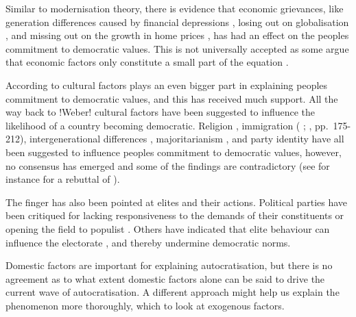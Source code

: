 Similar to modernisation theory, there is evidence that economic grievances, like generation differences caused by financial depressions \citep[pp. 132-174]{norris_cultural_2019}, losing out on globalisation \citep{ballard-rosa_economic_2021}, and missing out on the growth in home prices \citep{ansell_sheltering_2022}, has had an effect on the peoples commitment to democratic values. This is not universally accepted as some argue that economic factors only constitute a small part of the equation \citep{margalit_economic_2019}.

According to \citet{margalit_economic_2019} cultural factors plays an even bigger part in explaining peoples commitment to democratic values, and this has received much support. All the way back to !Weber! cultural factors have been suggested to influence the likelihood of a country becoming democratic. Religion \citep[pp.72-85]{huntington_third_1991}, immigration (\citeauthor{dinas_waking_2019} \citeyear{dinas_waking_2019}; \citeauthor{norris_cultural_2019} \citeyear{norris_cultural_2019}, pp.~175-212), intergenerational differences \citep{foa_youth_2020, foa_danger_2016, norris_cultural_2019, wuttke_have_2022}, majoritarianism \citep{grossman_majoritarian_2022, wunsch_demand_2023}, and party identity \citep{abramowitz_united_2019, bisgaard_how_2019, graham_democracy_2020, iyengar_strengthening_2018, krishnarajan_rationalizing_2023, peterson_partisan_2021, singer_fiddling_2023} have all been suggested to influence peoples commitment to democratic values, however, no consensus has emerged and some of the findings are contradictory (see for instance \citeauthor{schafer_cultural_2022} \citeyear{schafer_cultural_2022} for a rebuttal of \citeauthor{norris_cultural_2019} \citeyear{norris_cultural_2019}). 

The finger has also been pointed at elites and their actions. Political parties have been critiqued for lacking responsiveness to the demands of their constituents or opening the field to populist \citep{berman_causes_2021, grzymala-busse_failure_2019}. Others have indicated that elite behaviour can influence the electorate \citep{broockman_causal_2017, clayton_elite_2021}, and thereby undermine democratic norms.

Domestic factors are important for explaining autocratisation, but there is no agreement as to what extent domestic factors alone can be said to drive the current wave of autocratisation. A different approach might help us explain the phenomenon more thoroughly, which to look at exogenous factors.

